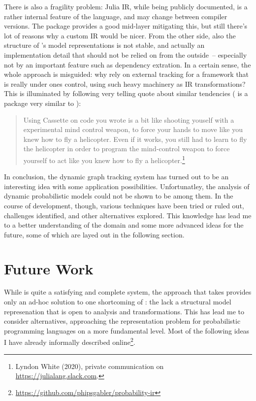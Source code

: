 There is also a fragility problem: Julia IR, while being publicly documented, is a rather internal
feature of the language, and may change between compiler versions.  The 
package provides a good mid-layer mitigating this, but still there's lot of reasons why a custom IR
would be nicer.  From the other side, also the structure of \dppljl{}'s model representations is not
stable, and actually an implementation detail that should not be relied on from the outside~--
especially not by an important feature such as dependency extration.  In a certain sense, the whole
approach is misguided: why rely on external tracking for a framework that is really under ones
control, using such heavy machinery as IR transformations?  This is illuminated by following very
telling quote about similar tendencies ( is a package very similar to
):
\begin{quote}
  Using Cassette on code you wrote is a bit like shooting youself with a experimental mind control
  weapon, to force your hands to move like you knew how to fly a helicopter.  Even if it works, you
  still had to learn to fly the helicopter in order to program the mind-control weapon to force
  yourself to act like you knew how to fly a helicopter.\footnote{Lyndon White (2020), private
    communication on \protect\url{https://julialang.slack.com}.}
\end{quote}

In conclusion, the dynamic graph tracking system has turned out to be an interesting idea with some
application possibilities.  Unfortunatley, the analysis of dynamic probabilistic models could not be
shown to be among them.  In the course of development, though, various techniques have been tried or
ruled out, challenges identified, and other alternatives explored.  This knowledge has lead me to a
better understanding of the domain and some more advanced ideas for the future, some of which are
layed out in the following section.

\section{Future Work}
\label{sec:future-work}

While \irtrackerjl{} is quite a satisfying and complete system, the approach that \autogibbsjl{}
takes provides only an ad-hoc solution to one shortcoming of \turingjl{}: the lack a structural
model represenation that is open to analysis and transformations.  This has lead me to consider
alternatives, approaching the representation problem for probabilistic programming languages on a
more fundamental level.  Most of the following ideas I have already informally described
online\footnote{\protect\url{https://github.com/phipsgabler/probability-ir}}.

